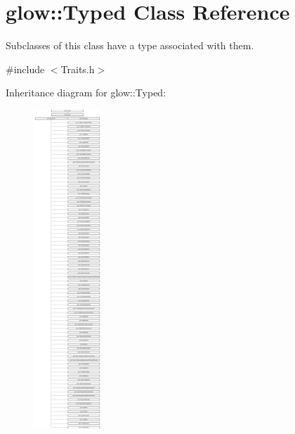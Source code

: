 \hypertarget{classglow_1_1_typed}{}\section{glow\+:\+:Typed Class Reference}
\label{classglow_1_1_typed}


Subclasses of this class have a type associated with them.  




{\ttfamily \#include $<$Traits.\+h$>$}

Inheritance diagram for glow\+:\+:Typed\+:\begin{figure}[H]
\begin{center}
\leavevmode
\includegraphics[height=12.000000cm]{classglow_1_1_typed}
\end{center}
\end{figure}
